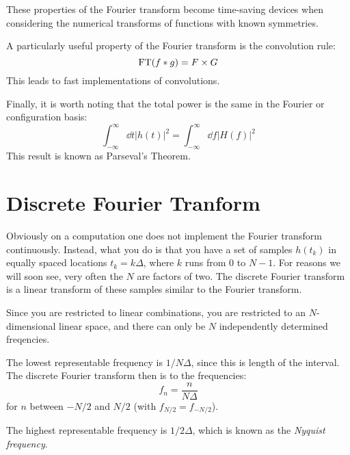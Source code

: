 These properties of the Fourier transform become time-saving devices
when considering the numerical transforms of functions with known
symmetries.

A particularly useful property of the Fourier transform is the
convolution rule:
\begin{equation}
{\rm FT}(f \ast g) = F \times G
\end{equation}
This leads to fast implementations of convolutions. 

Finally, it is worth noting that the total power is the same in the
Fourier or configuration basis:
\begin{equation}
\int_{-\infty}^{\infty} \dd{t} \left|h(t)\right|^2 = 
\int_{-\infty}^{\infty} \dd{f} \left|H(f)\right|^2
\end{equation}
This result is known as Parseval's Theorem.

\section{Discrete Fourier Tranform}

Obviously on a computation one does not implement the Fourier
transform continuously. Instead, what you do is that you have a set of
samples $h(t_k)$ in equally spaced locations $t_k = k \Delta$, where
$k$ runs from 0 to $N-1$.  For reasons we will soon see, very often
the $N$ are factors of two.  The discrete Fourier transform is a
linear transform of these samples similar to the Fourier transform.


\begin{answer}
Since you are restricted to linear combinations, you are restricted to
an $N$-dimensional linear space, and there can only be $N$
independently determined freqencies.
\end{answer}


\begin{answer}
The lowest representable frequency is $1/N\Delta$, since this is
length of the interval. The discrete Fourier transform then is to the
frequencies: 
\begin{equation} 
f_n = \frac{n}{N \Delta}
\end{equation}
for $n$ between $-N/2$ and $N/2$ (with $f_{N/2} = f_{-N/2}$).

The highest representable frequency is $1/2\Delta$, which is known as
the {\it Nyquist frequency}.
\end{answer}

